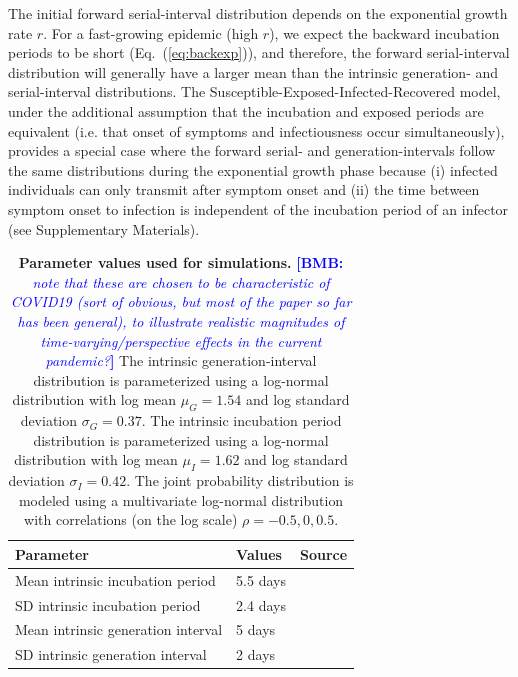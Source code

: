 \documentclass[12pt]{article}
\newcommand{\comment}{\showcomment}
\newcommand{\showcomment}[3]{\textcolor{#1}{\textbf{[#2: }\textsl{#3}\textbf{]}}}
\newcommand{\bmb}[1]{\comment{blue}{BMB}{#1}}
\newcommand{\eref}[1]{Eq.~(\ref{eq:#1})}
\begin{document}
The initial forward serial-interval distribution depends on the exponential growth rate $r$.
For a fast-growing epidemic (high $r$), we expect the backward incubation periods to be short (\eref{backexp}), and therefore, the forward serial-interval distribution will generally have a larger mean than the intrinsic generation- and serial-interval distributions.
The Susceptible-Exposed-Infected-Recovered model, under the additional assumption that the incubation and exposed periods are equivalent (i.e. that onset of symptoms and infectiousness occur simultaneously), provides a special case where the forward serial- and generation-intervals follow the same distributions during the exponential growth phase because (i) infected individuals can only transmit after symptom onset and (ii) the time between symptom onset to infection is independent of the incubation period of an infector (see Supplementary Materials).

\begin{table}[!th]
\begin{center}
\begin{tabular}{|l|l|r|}
\hline
Parameter & Values & Source\\
\hline
Mean intrinsic incubation period & 5.5 days & \cite{lauer2020incubation} \\
SD intrinsic incubation period & 2.4 days & \cite{lauer2020incubation} \\
Mean intrinsic generation interval & 5 days & \cite{ferretti2020quantifying} \\
SD intrinsic generation interval & 2 days & \cite{ferretti2020quantifying} \\
\hline
\end{tabular}
\end{center}
\caption{
  \textbf{Parameter values used for simulations.}
  \bmb{note that these are chosen to be characteristic of COVID19 (sort of obvious, but most of the paper so far has been general), to illustrate realistic magnitudes of time-varying/perspective effects in the current pandemic?}
The intrinsic generation-interval distribution is parameterized using a log-normal distribution with log mean $\mu_G=1.54$ and log standard deviation $\sigma_G=0.37$.
The intrinsic incubation period distribution is parameterized using a log-normal distribution with log mean $\mu_I=1.62$ and log standard deviation $\sigma_I=0.42$.
The joint probability distribution is modeled using a multivariate log-normal distribution with correlations (on the log scale) $\rho=-0.5, 0, 0.5$.
}
\end{table}
\end{document}
